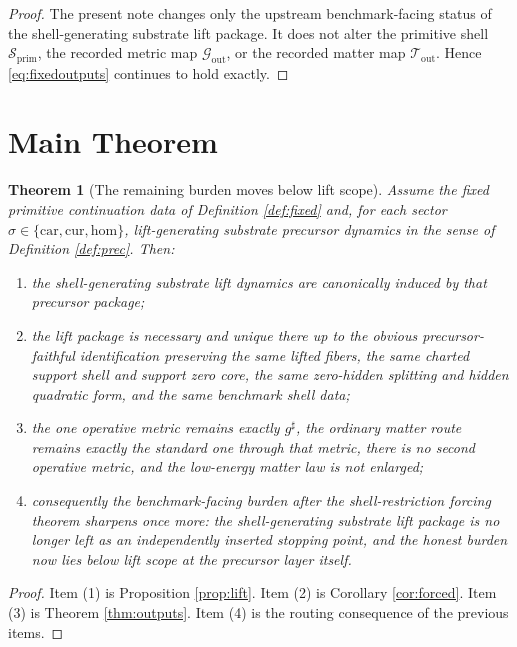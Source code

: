 \documentclass[11pt]{article}
\newcommand{\CompletedMetric}{g^{\sharp}}
\newcommand{\Car}{\mathrm{car}}
\newcommand{\Cur}{\mathrm{cur}}
\newcommand{\Hom}{\mathrm{hom}}
\newcommand{\PrimShell}{\mathcal S_{\mathrm{prim}}}
\newcommand{\MetricOut}{\mathscr G_{\mathrm{out}}}
\newcommand{\MatterOut}{\mathscr T_{\mathrm{out}}}
\newtheorem{theorem}{Theorem}
\begin{document}
\begin{proof}
The present note changes only the upstream benchmark-facing status of the shell-generating substrate lift package. It does not alter the primitive shell \(\PrimShell\), the recorded metric map \(\MetricOut\), or the recorded matter map \(\MatterOut\). Hence \eqref{eq:fixedoutputs} continues to hold exactly.
\end{proof}

\section{Main Theorem}

\begin{theorem}[The remaining burden moves below lift scope]
\label{thm:main}
Assume the fixed primitive continuation data of Definition \ref{def:fixed} and, for each sector \(\sigma\in\{\Car,\Cur,\Hom\}\), lift-generating substrate precursor dynamics in the sense of Definition \ref{def:prec}. Then:
\begin{enumerate}
    \item the shell-generating substrate lift dynamics are canonically induced by that precursor package;
    \item the lift package is necessary and unique there up to the obvious precursor-faithful identification preserving the same lifted fibers, the same charted support shell and support zero core, the same zero-hidden splitting and hidden quadratic form, and the same benchmark shell data;
    \item the one operative metric remains exactly \(\CompletedMetric\), the ordinary matter route remains exactly the standard one through that metric, there is no second operative metric, and the low-energy matter law is not enlarged;
    \item consequently the benchmark-facing burden after the shell-restriction forcing theorem sharpens once more: the shell-generating substrate lift package is no longer left as an independently inserted stopping point, and the honest burden now lies below lift scope at the precursor layer itself.
\end{enumerate}
\end{theorem}

\begin{proof}
Item (1) is Proposition \ref{prop:lift}. Item (2) is Corollary \ref{cor:forced}. Item (3) is Theorem \ref{thm:outputs}. Item (4) is the routing consequence of the previous items.
\end{proof}
\end{document}
